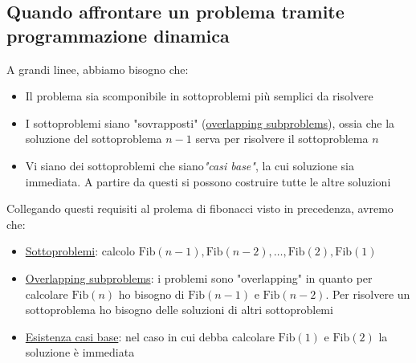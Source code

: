 \subsection{Quando affrontare un problema tramite programmazione dinamica}
A grandi linee, abbiamo bisogno che:
\begin{itemize}
	\item Il problema sia scomponibile in sottoproblemi più semplici da risolvere
	\item I sottoproblemi siano "sovrapposti" (\underline{overlapping subproblems}), ossia che la soluzione del sottoproblema $ n - 1$ serva per risolvere il sottoproblema $ n $
	\item Vi siano dei sottoproblemi che siano\textit{"casi base"}, la cui soluzione sia immediata. A partire da questi si possono costruire tutte le altre soluzioni
\end{itemize}
Collegando questi requisiti al prolema di fibonacci visto in precedenza, avremo che:
\begin{itemize}
	\item \underline{Sottoproblemi}: calcolo $\text{Fib}(n-1), \text{Fib}(n-2), \ldots , \text{Fib}\left(2\right), \text{Fib}\left(1\right)$
	\item \underline{Overlapping subproblems}: i problemi sono "overlapping" in quanto per calcolare $ \text{Fib}\left(n\right) $ ho bisogno di $ \text{Fib}\left(n-1\right) $ e $ \text{Fib}\left(n-2\right) $. Per risolvere un sottoproblema ho bisogno delle soluzioni di altri sottoproblemi
	\item \underline{Esistenza casi base}: nel caso in cui debba calcolare  $ \text{Fib}\left(1\right) $ e $ \text{Fib}\left(2\right) $ la soluzione è immediata
\end{itemize}

